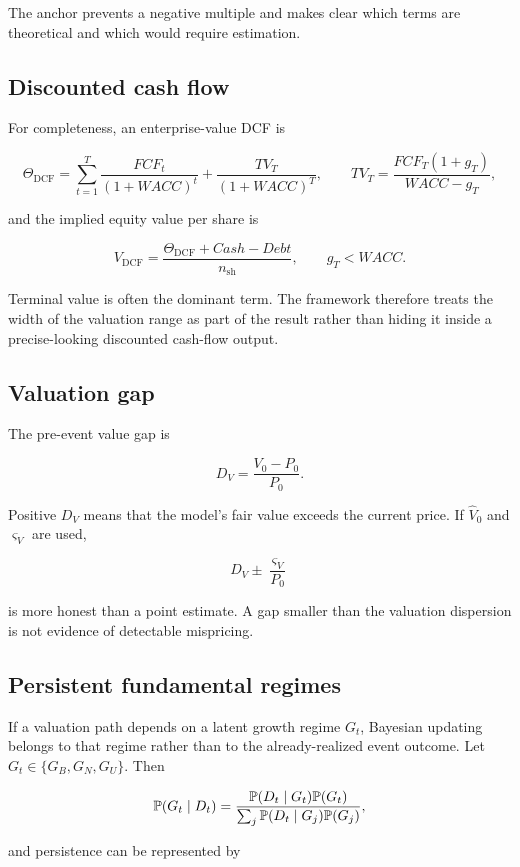 The anchor prevents a negative multiple and makes clear which terms are
theoretical and which would require estimation.

\subsection{Discounted cash flow}

For completeness, an enterprise-value DCF is

\[
\Theta_{\mathrm{DCF}}
=\sum_{t=1}^{T}\frac{FCF_t}{(1+WACC)^t}
 +\frac{TV_T}{(1+WACC)^T},
\qquad
TV_T=\frac{FCF_T(1+g_T)}{WACC-g_T},
\]

and the implied equity value per share is

\[
V_{\mathrm{DCF}}
=\frac{\Theta_{\mathrm{DCF}}+\mathit{Cash}-\mathit{Debt}}{n_{\mathrm{sh}}},
\qquad g_T<WACC.
\]

Terminal value is often the dominant term. The framework therefore treats the
width of the valuation range as part of the result rather than hiding it inside
a precise-looking discounted cash-flow output.

\subsection{Valuation gap}

The pre-event value gap is

\[
\boxed{
D_V=\frac{V_0-P_0}{P_0}.
}
\]

Positive $D_V$ means that the model's fair value exceeds the current price. If
$\hat V_0$ and $\varsigma_V$ are used,

\[
D_V\pm\frac{\varsigma_V}{P_0}
\]

is more honest than a point estimate. A gap smaller than the valuation
dispersion is not evidence of detectable mispricing.

\subsection{Persistent fundamental regimes}

If a valuation path depends on a latent growth regime $G_t$, Bayesian updating
belongs to that regime rather than to the already-realized event outcome. Let
$G_t\in\{G_B,G_N,G_U\}$. Then

\[
\mathbb{P}(G_t\mid D_t)
=\frac{\mathbb{P}(D_t\mid G_t)\mathbb{P}(G_t)}
{\sum_j\mathbb{P}(D_t\mid G_j)\mathbb{P}(G_j)},
\]

and persistence can be represented by

